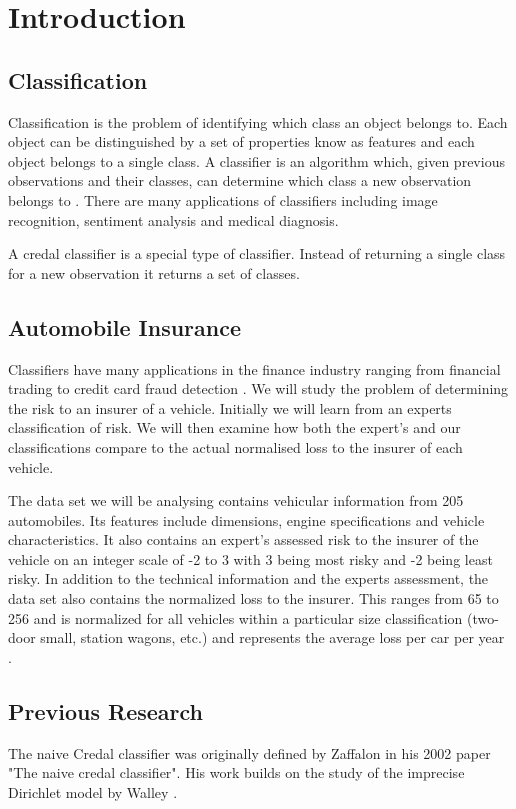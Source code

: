 \chapter{Introduction}

\section{Classification}

Classification is the problem of identifying which class an object belongs to.
Each object can be distinguished by a set of properties know as features and each object belongs to a single class.
A classifier is an algorithm which, given previous observations and their classes, can determine which class a new observation belongs to \cite{Theodoridis03}.
There are many applications of classifiers including image recognition, sentiment analysis and medical diagnosis.

A credal classifier is a special type of classifier.
Instead of returning a single class for a new observation it returns a set of classes.

\section{Automobile Insurance}

Classifiers have many applications in the finance industry ranging from financial trading \cite{Gerlein16} to credit card fraud detection \cite{Pozzolo15}.
We will study the problem of determining the risk to an insurer of a vehicle.
Initially we will learn from an experts classification of risk.
We will then examine how both the expert's and our classifications compare to the actual normalised loss to the insurer of each vehicle.

The data set we will be analysing contains vehicular information from 205 automobiles.
Its features include dimensions, engine specifications and vehicle characteristics.
It also contains an expert's assessed risk to the insurer of the vehicle on an integer scale of -2 to 3 with 3 being most risky and -2 being least risky.
In addition to the technical information and the experts assessment, the data set also contains the normalized loss to the insurer.
This ranges from 65 to 256 and is normalized for all vehicles within a particular size classification (two-door small, station wagons, etc.) and represents the average loss per car per year \cite{Automobile}.

\section{Previous Research}
The naive Credal classifier was originally defined by Zaffalon in his 2002 paper "The naive credal classifier".
His work builds on the study of the imprecise Dirichlet model by Walley \cite{Walley96}.
